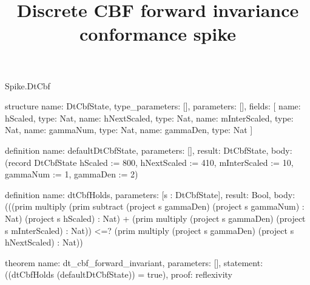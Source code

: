 \begin{lexlean}{Spike.DtCbf}
\title{Discrete CBF forward invariance conformance spike}
\begin{semanticmodule}
structure{
  name: DtCbfState,
  type_parameters: [],
  parameters: [],
  fields: [
    {name: hScaled, type: Nat},
    {name: hNextScaled, type: Nat},
    {name: mInterScaled, type: Nat},
    {name: gammaNum, type: Nat},
    {name: gammaDen, type: Nat}
  ]
}

definition{
  name: defaultDtCbfState,
  parameters: [],
  result: DtCbfState,
  body: (record DtCbfState {hScaled := 800, hNextScaled := 410, mInterScaled := 10, gammaNum := 1, gammaDen := 2})
}

definition{
  name: dtCbfHolds,
  parameters: [s : DtCbfState],
  result: Bool,
  body: (((prim multiply (prim subtract (project s gammaDen) (project s gammaNum) : Nat) (project s hScaled) : Nat) + (prim multiply (project s gammaDen) (project s mInterScaled) : Nat)) <=? (prim multiply (project s gammaDen) (project s hNextScaled) : Nat))
}

theorem{
  name: dt_cbf_forward_invariant,
  parameters: [],
  statement: ((dtCbfHolds (defaultDtCbfState)) = true),
  proof: reflexivity{}
}
\end{semanticmodule}
\end{lexlean}
